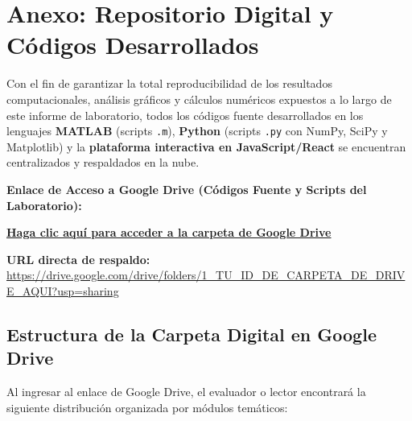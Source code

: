 \documentclass[11pt,a4paper]{article}
\newcommand{\driveLink}{https://drive.google.com/drive/folders/1_TU_ID_DE_CARPETA_DE_DRIVE_AQUI?usp=sharing}
\begin{document}
\newpage
\appendix
\section{Anexo: Repositorio Digital y C\'odigos Desarrollados}

Con el fin de garantizar la total reproducibilidad de los resultados computacionales, an\'alisis gr\'aficos y c\'alculos num\'ericos expuestos a lo largo de este informe de laboratorio, todos los c\'odigos fuente desarrollados en los lenguajes \textbf{MATLAB} (scripts \texttt{.m}), \textbf{Python} (scripts \texttt{.py} con NumPy, SciPy y Matplotlib) y la \textbf{plataforma interactiva en JavaScript/React} se encuentran centralizados y respaldados en la nube.

\vspace{0.4cm}

\begin{driveLinkBox}
  \textbf{Enlace de Acceso a Google Drive (C\'odigos Fuente y Scripts del Laboratorio):}
  \vspace{0.3cm}
  
  \centering
  \Large
  \href{\driveLink}{\color{blue}\textbf{Haga clic aqu\'i para acceder a la carpeta de Google Drive}}
  
  \vspace{0.3cm}
  \normalsize
  \textbf{URL directa de respaldo:} \\
  \small\url{\driveLink}
\end{driveLinkBox}

\vspace{0.6cm}

\subsection{Estructura de la Carpeta Digital en Google Drive}
Al ingresar al enlace de Google Drive, el evaluador o lector encontrar\'a la siguiente distribuci\'on organizada por m\'odulos tem\'aticos:
\end{document}
